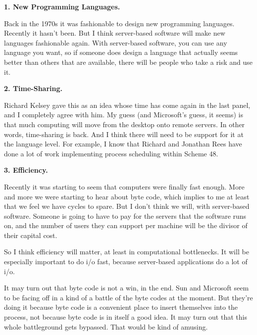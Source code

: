 \textbf{1. New Programming Languages.}

Back in the 1970s it was fashionable to design
                    new programming languages. Recently it hasn't been. But I
                    think server-based software will make new languages
                    fashionable again. With server-based software, you can use
                    any language you want, so if someone does design a language
                    that actually seems better than others that are available,
                    there will be people who take a risk and use it.

\textbf{2. Time-Sharing.}

Richard Kelsey gave this as an idea whose time
                    has come again in the last panel, and I completely agree
                    with him. My guess (and Microsoft's guess, it seems) is that
                    much computing will move from the desktop onto remote
                    servers. In other words, time-sharing is back. And I think
                    there will need to be support for it at the language level.
                    For example, I know that Richard and Jonathan Rees have done
                    a lot of work implementing process scheduling within Scheme
                    48.

\textbf{3. Efficiency.}

Recently it
                    was starting to seem that computers were finally fast
                    enough. More and more we were starting to hear about byte
                    code, which implies to me at least that we feel we have
                    cycles to spare. But I don't think we will, with
                    server-based software. Someone is going to have to pay for
                    the servers that the software runs on, and the number of
                    users they can support per machine will be the divisor of
                    their capital cost.

So I think efficiency will
                    matter, at least in computational bottlenecks. It will be
                    especially important to do i/o fast, because server-based
                    applications do a lot of i/o.

It may turn out
                    that byte code is not a win, in the end. Sun and Microsoft
                    seem to be facing off in a kind of a battle of the byte
                    codes at the moment. But they're doing it because byte code
                    is a convenient place to insert themselves into the process,
                    not because byte code is in itself a good idea. It may turn
                    out that this whole battleground gets bypassed. That would
                    be kind of amusing.





